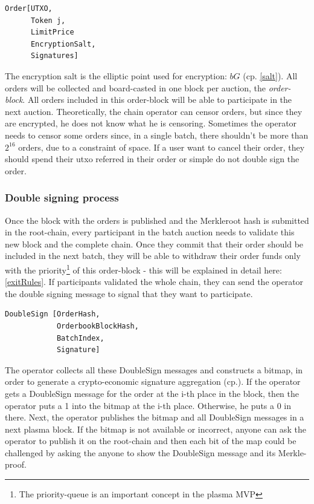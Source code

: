 \documentclass[11pt,parskip=full]{scrartcl}%
\begin{document}
\begin{verbatim}
Order[UTXO, 
      Token j,
      LimitPrice 
      EncryptionSalt,
      Signatures]
\end{verbatim} 
The encryption salt is the elliptic point used for encryption:  $bG$ (cp. \ref{salt}). 
All orders will be collected and board-casted in one block per auction, the \emph{order-block}. 
All orders included in this order-block will be able to participate in the next auction. 
Theoretically, the chain operator can censor orders, but since they are encrypted, he does not know what he is censoring. 
Sometimes the operator needs to censor some orders since, in a single batch, there shouldn't be more than $2^{16}$ orders, due to a constraint of space. 
If a user want to cancel their order, they should spend their utxo referred in their order or simple do not double sign the order. 

\subsubsection{Double signing process}
Once the block with the orders is published and the Merkleroot hash is submitted in the root-chain, every participant in the batch auction needs to validate this new block and the complete chain. 
Once they commit that their order should be included in the next batch, they will be able to withdraw their order funds only with the priority\footnote{The priority-queue is an important concept in the plasma MVP} of this order-block - this will be explained in detail here: \ref{exitRules}. \newline
If participants validated the whole chain, they can send the operator the double signing message to signal that they want to participate. 

\begin{verbatim}
DoubleSign [OrderHash,
            OrderbookBlockHash,
            BatchIndex,
            Signature]
\end{verbatim}

The operator collects all these DoubleSign messages and constructs a bitmap, in order to generate a crypto-economic signature aggregation (cp.\cite{sig}). 
If the operator gets a DoubleSign message for the order at the i-th place in the block, then the operator puts a 1 into the bitmap at the i-th place. 
Otherwise, he puts a 0 in there.
Next, the operator publishes the bitmap and all DoubleSign messages in a next plasma block. 
If the bitmap is not available or incorrect, anyone can ask the operator to publish it on the root-chain and then each bit of the map could be challenged by asking the anyone to show the DoubleSign message and its Merkle-proof. 
\end{document}
